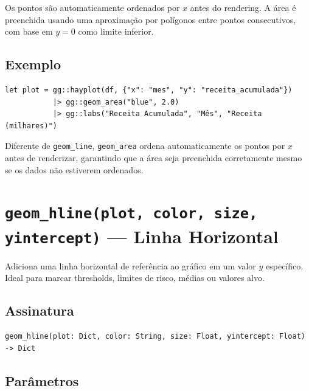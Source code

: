 \documentclass[12pt, a4paper, oneside]{book}
\newcommand{\code}[1]{\texttt{#1}}
\begin{document}
Os pontos são automaticamente ordenados por $x$ antes do rendering. A área é
preenchida usando uma aproximação por polígonos entre pontos consecutivos, com
base em $y=0$ como limite inferior.

\subsection*{Exemplo}

\begin{lstlisting}[caption={Gráfico de área para receita acumulada}]
let plot = gg::hayplot(df, {"x": "mes", "y": "receita_acumulada"})
           |> gg::geom_area("blue", 2.0)
           |> gg::labs("Receita Acumulada", "Mês", "Receita (milhares)")
\end{lstlisting}

\begin{tipbox}[title={\textbf{Dica:} Ordenação automática}]
  Diferente de \code{geom\_line}, \code{geom\_area} ordena automaticamente os pontos
  por $x$ antes de renderizar, garantindo que a área seja preenchida corretamente
  mesmo se os dados não estiverem ordenados.
\end{tipbox}

\section{\texttt{geom\_hline(plot, color, size, yintercept)} --- Linha Horizontal}

Adiciona uma linha horizontal de referência ao gráfico em um valor $y$ específico.
Ideal para marcar thresholds, limites de risco, médias ou valores alvo.

\subsection*{Assinatura}

\begin{lstlisting}[style=inline]
geom_hline(plot: Dict, color: String, size: Float, yintercept: Float) -> Dict
\end{lstlisting}

\subsection*{Parâmetros}
\end{document}
